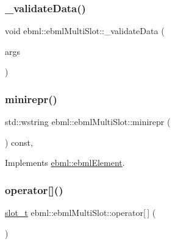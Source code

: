 \mbox{\label{classebml_1_1ebmlMultiSlot_a4c3233d2c54713803d113d6bed9b4663}} 
\subsubsection{\texorpdfstring{\+\_\+validate\+Data()}{\_validateData()}\hspace{0.1cm}{\footnotesize\ttfamily [2/2]}}
{\footnotesize\ttfamily void ebml\+::ebml\+Multi\+Slot\+::\+\_\+validate\+Data (\begin{DoxyParamCaption}\item[{const \mbox{\hyperlink{namespaceebml_a4317d4c495715eced3ed448c2d05caeb}{slot\+Arg\+\_\+d}} \&}]{args }\end{DoxyParamCaption})\hspace{0.3cm}{\ttfamily [protected]}}

\mbox{\label{classebml_1_1ebmlMultiSlot_a3a2407406cd68f27d974cc18223c86c0}} 
\subsubsection{\texorpdfstring{minirepr()}{minirepr()}}
{\footnotesize\ttfamily std\+::wstring ebml\+::ebml\+Multi\+Slot\+::minirepr (\begin{DoxyParamCaption}{ }\end{DoxyParamCaption}) const\hspace{0.3cm}{\ttfamily [override]}, {\ttfamily [virtual]}}



Implements \mbox{\hyperlink{classebml_1_1ebmlElement_a7852173aeef78bd843939ae5a82f1d1c}{ebml\+::ebml\+Element}}.

\mbox{\label{classebml_1_1ebmlMultiSlot_a9edb99f1fd34d4ba765fa5f1266026ec}} 
\subsubsection{\texorpdfstring{operator[]()}{operator[]()}\hspace{0.1cm}{\footnotesize\ttfamily [1/4]}}
{\footnotesize\ttfamily \mbox{\hyperlink{classebml_1_1slot__t}{slot\+\_\+t}} ebml\+::ebml\+Multi\+Slot\+::operator\mbox{[}$\,$\mbox{]} (\begin{DoxyParamCaption}\item[{size\+\_\+t}]{ }\end{DoxyParamCaption})}

